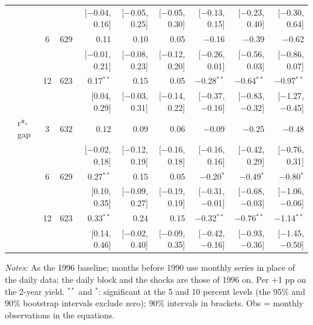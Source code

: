 \begin{longtable}{llcrrrrrrr}
 & & & & {\scriptsize [$-$0.04, 0.16]} & {\scriptsize [$-$0.05, 0.25]} & {\scriptsize [$-$0.05, 0.30]} & {\scriptsize [$-$0.13, 0.15]} & {\scriptsize [$-$0.23, 0.40]} & {\scriptsize [$-$0.30, 0.64]}\\
 &  & 6 & 629 & 0.11 & 0.10 & 0.05 & $-$0.16 & $-$0.39 & $-$0.62\\
 & & & & {\scriptsize [$-$0.01, 0.21]} & {\scriptsize [$-$0.08, 0.23]} & {\scriptsize [$-$0.12, 0.20]} & {\scriptsize [$-$0.26, 0.01]} & {\scriptsize [$-$0.56, 0.03]} & {\scriptsize [$-$0.86, 0.07]}\\
 &  & 12 & 623 & 0.17$^{**}$ & 0.15 & 0.05 & $-$0.28$^{**}$ & $-$0.64$^{**}$ & $-$0.97$^{**}$\\
 & & & & {\scriptsize [0.04, 0.29]} & {\scriptsize [$-$0.03, 0.31]} & {\scriptsize [$-$0.14, 0.22]} & {\scriptsize [$-$0.37, $-$0.16]} & {\scriptsize [$-$0.83, $-$0.32]} & {\scriptsize [$-$1.27, $-$0.45]}\\
 & r*-gap & 3 & 632 & 0.12 & 0.09 & 0.06 & $-$0.09 & $-$0.25 & $-$0.48\\
 & & & & {\scriptsize [$-$0.02, 0.18]} & {\scriptsize [$-$0.12, 0.19]} & {\scriptsize [$-$0.16, 0.18]} & {\scriptsize [$-$0.16, 0.16]} & {\scriptsize [$-$0.42, 0.29]} & {\scriptsize [$-$0.76, 0.31]}\\
 &  & 6 & 629 & 0.27$^{**}$ & 0.15 & 0.05 & $-$0.20$^{*}$ & $-$0.49$^{*}$ & $-$0.80$^{*}$\\
 & & & & {\scriptsize [0.10, 0.35]} & {\scriptsize [$-$0.09, 0.27]} & {\scriptsize [$-$0.19, 0.19]} & {\scriptsize [$-$0.31, $-$0.01]} & {\scriptsize [$-$0.68, $-$0.03]} & {\scriptsize [$-$1.06, $-$0.06]}\\
 &  & 12 & 623 & 0.33$^{**}$ & 0.24 & 0.15 & $-$0.32$^{**}$ & $-$0.76$^{**}$ & $-$1.14$^{**}$\\
 & & & & {\scriptsize [0.14, 0.46]} & {\scriptsize [$-$0.02, 0.40]} & {\scriptsize [$-$0.09, 0.35]} & {\scriptsize [$-$0.42, $-$0.16]} & {\scriptsize [$-$0.93, $-$0.36]} & {\scriptsize [$-$1.45, $-$0.50]}\\
\end{longtable}
\begin{flushleft}\footnotesize\textit{Notes:} As the 1996 baseline; months before 1990 use monthly series in place of the daily data; the daily block and the shocks are those of 1996 on. Per +1 pp on the 2-year yield. $^{**}$ and $^{*}$: significant at the 5 and 10 percent levels (the 95\% and 90\% bootstrap intervals exclude zero); 90\% intervals in brackets. Obs = monthly observations in the equations.\end{flushleft}
\endgroup
